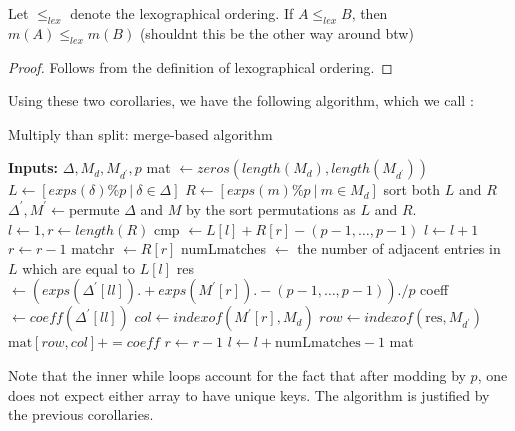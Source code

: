 \begin{cor}
	\label{cor:match:order}
	Let \(\leq_{lex}\) denote the 
	lexographical ordering.
	If \(A \leq_{lex} B\),
	then 
	\(m(A) \leq_{lex} m(B)\)
    (shouldnt this be the other way around btw)
\end{cor}

\begin{proof}
	Follows from the definition of lexographical
	ordering.
\end{proof}

Using these two corollaries, we have the following algorithm,
which we call \merge:

\begin{algorithm}[H]
\caption{Multiply than split: merge-based algorithm}
\label{alg:theta:merge}
\begin{algorithmic}[1]
\State \textbf{Inputs:} \(\Delta, M_{d}, M_{d^{\prime}}, p\)
\State mat \(\gets zeros(length(M_{d}), length(M_{d^{\prime}}))\) 
\State $L \gets [exps(\delta) \% p ~|~ \delta \in \Delta]$
\State $R \gets [exps(m) \% p ~|~ m \in M_{d}]$
\State sort both  \(L\) and \(R\) 
\State \(\Delta^{\prime}, M^{\prime} \gets \)permute \(\Delta\) and \(M\) by the sort permutations as \(L\) and \(R\).
\State \(l \gets 1, r \gets length(R)\)
	\State cmp \(\gets L[l] + R[r] - (p-1, \ldots, p-1)\) 
	    \State \(l \gets l + 1\) 
	    \State \(r \gets r - 1\)
        \State matchr \(\gets R[r]\) 
        \State numLmatches \(\gets\) the number of adjacent entries in \(L\) which are equal to \(L[l]\) 
                \State res \(\gets (exps(\Delta^{\prime}[ll]) .+ exps(M^{\prime}[r]) .- (p-1, \ldots, p-1)) ./ p\) 
                \State coeff \(\gets coeff(\Delta^{\prime}[ll])\)
                \State \(col \gets indexof(M^{\prime}[r],M_{d})\)
                \State \(row \gets indexof(\text{res},M_{d^{\prime}})\)
                \State \(\text{mat}[row,col] += coeff\) 
            \EndFor
            \State \(r \gets r - 1\)
        \EndWhile     
        \State \(l \gets l + \text{numLmatches} - 1\) 
    \EndIf
\EndWhile
\State \Return mat
\end{algorithmic}
\end{algorithm}

Note that the inner while loops account for the fact that
after modding by \(p\), one does not expect 
either array to have unique keys.
The algorithm is justified by the previous corollaries.

